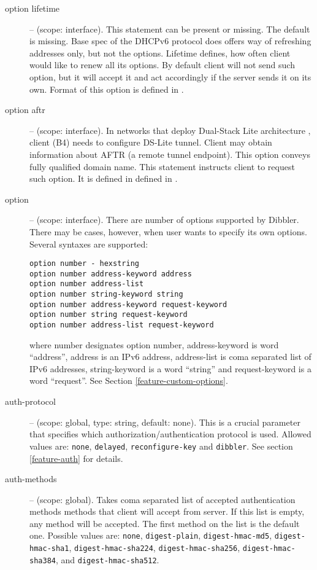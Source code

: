 \begin{description}
 \item[option lifetime] -- (scope: interface). This statement can be
   present or missing. The default is missing.
   Base spec of the DHCPv6 protocol does offers way of refreshing
   addresses only, but not the options. Lifetime defines, how often
   client would like to renew all its options. By default client will
   not send such option, but it will accept it and act accordingly if
   the server sends it on its own. Format of this option is defined
   in \cite{rfc4242}.

 \item[option aftr] -- (scope: interface). In networks that deploy
   Dual-Stack Lite architecture \cite{rfc6333}, client (B4) needs to
   configure DS-Lite tunnel. Client may obtain information about AFTR
   (a remote tunnel endpoint). This option conveys fully qualified
   domain name. This statement instructs client to request such
   option. It is defined in defined in \cite{rfc6334}.

\item[option] -- (scope: interface). There are number of options
   supported by Dibbler. There may be cases, however, when user wants
   to specify its own options. Several syntaxes are supported:
\begin{lstlisting}
option number - hexstring
option number address-keyword address
option number address-list
option number string-keyword string
option number address-keyword request-keyword
option number string request-keyword
option number address-list request-keyword
\end{lstlisting}
where number designates option number, address-keyword is word ``address'',
address is an IPv6 address, address-list is coma separated list of
IPv6 addresses, string-keyword is a word ``string'' and
request-keyword is a word ``request''. See Section \ref{feature-custom-options}.

\item[auth-protocol] -- (scope: global, type: string, default:
  none). This is a crucial parameter that specifies which
  authorization/authentication protocol is used. Allowed values are:
  \texttt{none}, \texttt{delayed}, \texttt{reconfigure-key} and
  \texttt{dibbler}. See section \ref{feature-auth} for details.

 \item[auth-methods] -- (scope: global). Takes coma separated
   list of accepted authentication methods methods that client will
   accept from server. If this list is empty, any method will be
   accepted. The first method on the list is the default one. Possible values
   are:  \texttt{none}, \texttt{digest-plain}, \texttt{digest-hmac-md5},
   \texttt{digest-hmac-sha1}, \texttt{digest-hmac-sha224},
   \texttt{digest-hmac-sha256}, \texttt{digest-hmac-sha384},
   and \texttt{digest-hmac-sha512}. 


\end{description}
